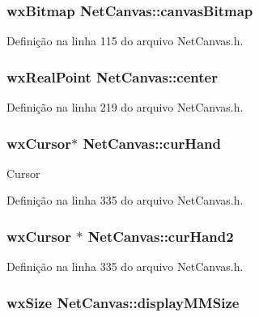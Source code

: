 \subsubsection[{canvas\+Bitmap}]{\setlength{\rightskip}{0pt plus 5cm}wx\+Bitmap Net\+Canvas\+::canvas\+Bitmap}\label{class_net_canvas_a0c0395615afcf673d959ef4b54e8333f}


Definição na linha 115 do arquivo Net\+Canvas.\+h.

\subsubsection[{center}]{\setlength{\rightskip}{0pt plus 5cm}wx\+Real\+Point Net\+Canvas\+::center}\label{class_net_canvas_a0c5498e09efec26f6b7d94a6c0b49338}


Definição na linha 219 do arquivo Net\+Canvas.\+h.

\subsubsection[{cur\+Hand}]{\setlength{\rightskip}{0pt plus 5cm}wx\+Cursor$\ast$ Net\+Canvas\+::cur\+Hand\hspace{0.3cm}{\ttfamily [protected]}}\label{class_net_canvas_a972abd5f80cb7052affab324a237dfa5}
Cursor 

Definição na linha 335 do arquivo Net\+Canvas.\+h.

\subsubsection[{cur\+Hand2}]{\setlength{\rightskip}{0pt plus 5cm}wx\+Cursor $\ast$ Net\+Canvas\+::cur\+Hand2\hspace{0.3cm}{\ttfamily [protected]}}\label{class_net_canvas_a005a5d12dcad90098a9534927f7b4820}


Definição na linha 335 do arquivo Net\+Canvas.\+h.

\subsubsection[{display\+M\+M\+Size}]{\setlength{\rightskip}{0pt plus 5cm}wx\+Size Net\+Canvas\+::display\+M\+M\+Size}\label{class_net_canvas_a5754ab87d684209ee93a1ba985207ba6}


